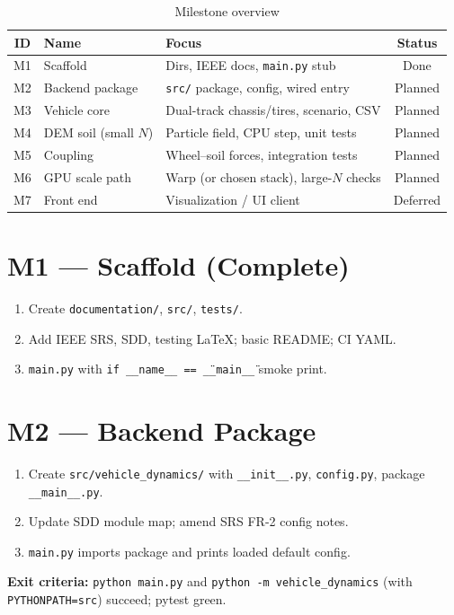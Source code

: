 \documentclass[conference]{IEEEtran}
\begin{document}
\begin{table}[!t]
\caption{Milestone overview}
\label{tab:milestones}
\centering
\begin{tabular}{@{}clp{5.2cm}c@{}}
\toprule
\textbf{ID} & \textbf{Name} & \textbf{Focus} & \textbf{Status} \\
\midrule
M1 & Scaffold & Dirs, IEEE docs, \texttt{main.py} stub & Done \\
M2 & Backend package & \texttt{src/} package, config, wired entry & Planned \\
M3 & Vehicle core & Dual-track chassis/tires, scenario, CSV & Planned \\
M4 & DEM soil (small $N$) & Particle field, CPU step, unit tests & Planned \\
M5 & Coupling & Wheel--soil forces, integration tests & Planned \\
M6 & GPU scale path & Warp (or chosen stack), large-$N$ checks & Planned \\
M7 & Front end & Visualization / UI client & Deferred \\
\bottomrule
\end{tabular}
\end{table}

\section{M1 --- Scaffold (Complete)}
\begin{enumerate}
  \item Create \texttt{documentation/}, \texttt{src/}, \texttt{tests/}.
  \item Add IEEE SRS, SDD, testing \LaTeX; basic README; CI YAML.
  \item \texttt{main.py} with \texttt{if \_\_name\_\_ == \"\_\_main\_\_\"} smoke print.
\end{enumerate}

\section{M2 --- Backend Package}
\begin{enumerate}
  \item Create \texttt{src/vehicle\_dynamics/} with \texttt{\_\_init\_\_.py},
        \texttt{config.py}, package \texttt{\_\_main\_\_.py}.
  \item Update SDD module map; amend SRS FR-2 config notes.
  \item \texttt{main.py} imports package and prints loaded default config.
\end{enumerate}
\textbf{Exit criteria:} \texttt{python main.py} and
\texttt{python -m vehicle\_dynamics} (with \texttt{PYTHONPATH=src}) succeed;
pytest green.
\end{document}
